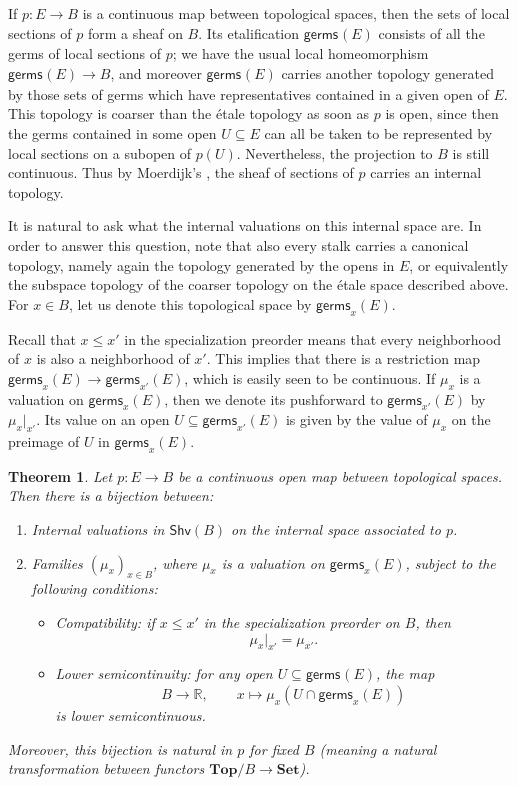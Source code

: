 \documentclass[11pt, oneside, article]{memoir}
\theoremstyle{plain}
\newtheorem{theorem}{Theorem}[chapter] %
\theoremstyle{definition}
\theoremstyle{remark}
\newcommand{\Cat}[1]{\mathbf{#1}}
\newcommand{\Fun}[1]{\mathsf{#1}}
\newcommand{\rr}{\mathbb{R}}
\newcommand{\germs}[2]{\mathsf{germs}_{#2}({#1})}
\newcommand{\shv}{\Fun{Shv}}
\begin{document}
If $p : E \to B$ is a continuous map between topological spaces, then the sets of local sections of $p$ form a sheaf on $B$. Its etalification $\germs{E}{}$ consists of all the germs of local sections of $p$; we have the usual local homeomorphism $\germs{E}{} \to B$, and moreover $\germs{E}{}$ carries another topology generated by those sets of germs which have representatives contained in a given open of $E$. This topology is coarser than the \'etale topology as soon as $p$ is open, since then the germs contained in some open $U \subseteq E$ can all be taken to be represented by local sections on a subopen of $p(U)$. Nevertheless, the projection to $B$ is still continuous. Thus by Moerdijk's , the sheaf of sections of $p$ carries an internal topology.

It is natural to ask what the internal valuations on this internal space are. In order to answer this question, note that also every stalk carries a canonical topology, namely again the topology generated by the opens in $E$, or equivalently the subspace topology of the coarser topology on the \'etale space described above. For $x \in B$, let us denote this topological space by $\germs{E}{x}$.

Recall that $x \le x'$ in the specialization preorder means that every neighborhood of $x$ is also a neighborhood of $x'$. This implies that there is a restriction map $\germs{E}{x} \to \germs{E}{x'}$, which is easily seen to be continuous. If $\mu_x$ is a valuation on $\germs{E}{x}$, then we denote its pushforward to $\germs{E}{x'}$ by $\mu_x|_{x'}$. Its value on an open $U \subseteq \germs{E}{x'}$ is given by the value of $\mu_x$ on the preimage of $U$ in $\germs{E}{x}$.  
\begin{theorem}
	\label{main_external}
	Let $p : E \to B$ be a continuous open map between topological spaces. Then there is a bijection between:
	\begin{enumerate}
		\item Internal valuations in $\shv(B)$ on the internal space associated to $p$.
		\item Families $(\mu_x)_{x \in B}$, where $\mu_x$ is a valuation on $\germs{E}{x}$, subject to the following conditions:
			\begin{itemize}
				\item Compatibility: if $x \le x'$ in the specialization preorder on $B$, then
					\[
						\mu_x|_{x'} = \mu_{x'}.
					\]
				\item Lower semicontinuity: for any open $U \subseteq \germs{E}{}$, the map
					\[
						B \longrightarrow \rr, \qquad x \longmapsto \mu_x(U \cap \germs{E}{x})
					\]
					is lower semicontinuous.
			\end{itemize}
	\end{enumerate}
	Moreover, this bijection is natural in $p$ for fixed $B$ (meaning a natural transformation between functors $\Cat{Top}/B \to \Cat{Set}$).
\end{theorem}
\end{document}

